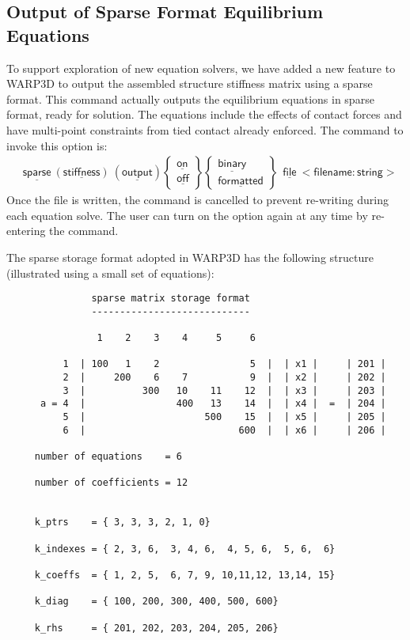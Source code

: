 \documentclass[11pt]{report}
\numberwithin{equation}{section}
\newcommand{\nin} {\noindent}
\newcommand{\ul} {\underline}
\newcommand{\hv} {\mathsf}   %
\begin{document}
\subsection{Output of Sparse Format Equilibrium Equations}
\nin To support exploration of new equation solvers, we have added a new feature to WARP3D 
to output the assembled structure stiffness matrix using a sparse format. This command 
actually outputs the equilibrium equations in sparse format, ready for solution. The equations 
include the effects of contact forces and have multi-point constraints from tied 
contact already enforced. The command to invoke this option is:
\begin{align*}
&\hv{\ul{sparse}\  (\ul{stiffness})\  (\ul{output})  }
\begin{Bmatrix}
\hv{\ul{on} }\\ \hv{\ul{off}}
\end{Bmatrix}
\begin{Bmatrix}
\hv{\ul{binary} }\\ \hv{\ul{formatted}}
\end{Bmatrix}
\hv{\ \ \ul{file}\ <file name: string>  }
\end{align*}
\nin Once the file is written, the command is cancelled to prevent re-writing during each 
equation solve. The user can turn on the option again at any time by re-entering the command. 

The sparse storage format adopted in WARP3D has the following structure (illustrated 
using a small set of equations):
\small
\begin{verbatim}
               sparse matrix storage format
               ----------------------------

                1    2    3    4     5     6

          1  | 100   1    2                5  |  | x1 |     | 201 |
          2  |     200    6    7           9  |  | x2 |     | 202 |
          3  |          300   10    11    12  |  | x3 |     | 203 |
      a = 4  |                400   13    14  |  | x4 |  =  | 204 |
          5  |                     500    15  |  | x5 |     | 205 |
          6  |                           600  |  | x6 |     | 206 |

     number of equations    = 6

     number of coefficients = 12


     k_ptrs    = { 3, 3, 3, 2, 1, 0}

     k_indexes = { 2, 3, 6,  3, 4, 6,  4, 5, 6,  5, 6,  6}

     k_coeffs  = { 1, 2, 5,  6, 7, 9, 10,11,12, 13,14, 15}

     k_diag    = { 100, 200, 300, 400, 500, 600}

     k_rhs     = { 201, 202, 203, 204, 205, 206}
\end{verbatim}
\normalsize
\end{document}
